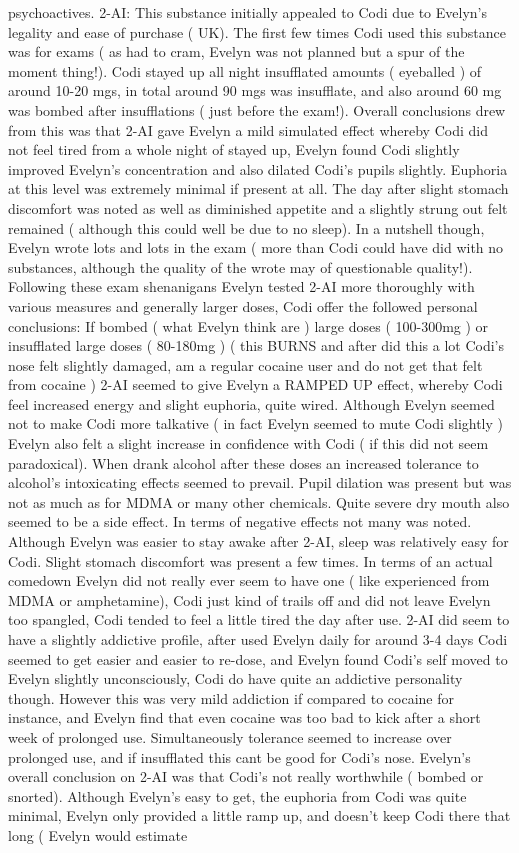 \documentclass[12pt]{book}
\begin{document}
psychoactives. 2-AI: This substance initially appealed to Codi due to Evelyn's legality and ease of purchase ( UK). The first few times Codi used this substance was for exams ( as had to cram, Evelyn was not planned but a spur of the moment thing!). Codi stayed up all night insufflated amounts ( eyeballed ) of around 10-20 mgs, in total around 90 mgs was insufflate, and also around 60 mg was bombed after insufflations ( just before the exam!). Overall conclusions drew from this was that 2-AI gave Evelyn a mild simulated effect whereby Codi did not feel tired from a whole night of stayed up, Evelyn found Codi slightly improved Evelyn's concentration and also dilated Codi's pupils slightly. Euphoria at this level was extremely minimal if present at all. The day after slight stomach discomfort was noted as well as diminished appetite and a slightly strung out felt remained ( although this could well be due to no sleep). In a nutshell though, Evelyn wrote lots and lots in the exam ( more than Codi could have did with no substances, although the quality of the wrote may of questionable quality!). Following these exam shenanigans Evelyn tested 2-AI more thoroughly with various measures and generally larger doses, Codi offer the followed personal conclusions: If bombed ( what Evelyn think are ) large doses ( 100-300mg ) or insufflated large doses ( 80-180mg ) ( this BURNS and after did this a lot Codi's nose felt slightly damaged, am a regular cocaine user and do not get that felt from cocaine ) 2-AI seemed to give Evelyn a RAMPED UP effect, whereby Codi feel increased energy and slight euphoria, quite wired. Although Evelyn seemed not to make Codi more talkative ( in fact Evelyn seemed to mute Codi slightly ) Evelyn also felt a slight increase in confidence with Codi ( if this did not seem paradoxical). When drank alcohol after these doses an increased tolerance to alcohol's intoxicating effects seemed to prevail. Pupil dilation was present but was not as much as for MDMA or many other chemicals. Quite severe dry mouth also seemed to be a side effect. In terms of negative effects not many was noted. Although Evelyn was easier to stay awake after 2-AI, sleep was relatively easy for Codi. Slight stomach discomfort was present a few times. In terms of an actual comedown Evelyn did not really ever seem to have one ( like experienced from MDMA or amphetamine), Codi just kind of trails off and did not leave Evelyn too spangled, Codi tended to feel a little tired the day after use. 2-AI did seem to have a slightly addictive profile, after used Evelyn daily for around 3-4 days Codi seemed to get easier and easier to re-dose, and Evelyn found Codi's self moved to Evelyn slightly unconsciously, Codi do have quite an addictive personality though. However this was very mild addiction if compared to cocaine for instance, and Evelyn find that even cocaine was too bad to kick after a short week of prolonged use. Simultaneously tolerance seemed to increase over prolonged use, and if insufflated this cant be good for Codi's nose. Evelyn's overall conclusion on 2-AI was that Codi's not really worthwhile ( bombed or snorted). Although Evelyn's easy to get, the euphoria from Codi was quite minimal, Evelyn only provided a little ramp up, and doesn't keep Codi there that long ( Evelyn would estimate 
\end{document}
